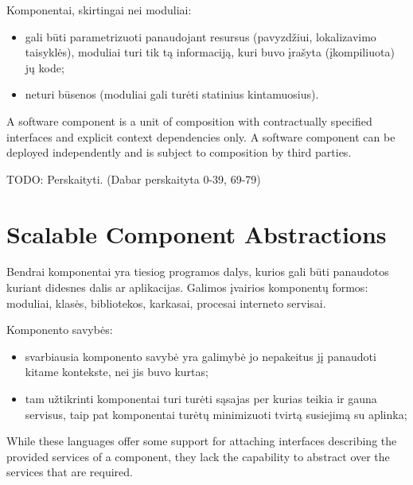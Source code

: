 Komponentai, skirtingai nei
moduliai\cite[39-40]{cs-beyond-object-oriented-programming}:
\begin{itemize}
  \item gali būti parametrizuoti panaudojant resursus (pavyzdžiui,
    lokalizavimo taisyklės), moduliai turi tik tą informaciją, kuri
    buvo įrašyta (įkompiliuota) jų kode;
  \item neturi būsenos (moduliai gali turėti statinius kintamuosius).
\end{itemize}

\begin{defn}
  A software component is a unit of composition with contractually
  specified interfaces and explicit context dependencies only. A
  software component can be deployed independently and is subject
  to composition by third parties.
  \cite[41]{cs-beyond-object-oriented-programming}
\end{defn}

TODO: Perskaityti. (Dabar perskaityta 0-39, 69-79)

\section{Scalable Component Abstractions}

Bendrai komponentai yra tiesiog programos dalys, kurios gali būti
panaudotos kuriant didesnes dalis ar aplikacijas. Galimos įvairios
komponentų formos: moduliai, klasės, bibliotekos, karkasai, procesai
interneto servisai.

Komponento savybės:
\begin{itemize}
  \item svarbiausia komponento savybė yra galimybė jo nepakeitus jį
    panaudoti kitame kontekste, nei jis buvo kurtas;
  \item tam užtikrinti komponentai turi turėti sąsajas per kurias
    teikia ir gauna servisus, taip pat komponentai turėtų minimizuoti
    tvirtą susiejimą  su aplinka;
\end{itemize}

\begin{note}
  While these languages offer some support for attaching interfaces
  describing the provided services of a component, they lack the
  capability to abstract over the services that are required.
  \cite[1]{scalable-component-abstractions}
\end{note}

